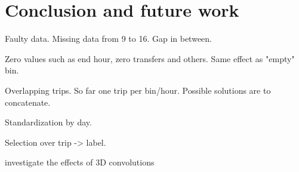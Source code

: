 \documentclass{article}
\begin{document}
\newpage
\section{Conclusion and future work}
\label{sec:conclusion}

Faulty data. Missing data from 9 to 16. Gap in between.

Zero values such as end hour, zero transfers and others. Same effect as "empty" bin. 

Overlapping trips. So far one trip per bin/hour. Possible solutions are to concatenate.

Standardization by day.

Selection over trip -> label. 

investigate the effects of 3D convolutions

\newpage
{}

\end{document}
